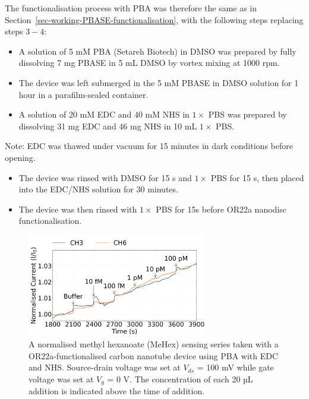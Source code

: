 \documentclass[
  a4paper,
]{scrbook}
\begin{document}
The functionalisation process with PBA was therefore the same as in
Section~\ref{sec-working-PBASE-functionalisation}, with the following
steps replacing steps \(3-4\):

\begin{itemize}
\item
  A solution of 5 mM PBA (Setareh Biotech) in DMSO was prepared by fully
  dissolving 7 mg PBASE in 5 mL DMSO by vortex mixing at 1000 rpm.
\item
  The device was left submerged in the 5 mM PBASE in DMSO solution for 1
  hour in a parafilm-sealed container.
\item
  A solution of 20 mM EDC and 40 mM NHS in \(1 \times\) PBS was prepared
  by dissolving 31 mg EDC and 46 mg NHS in 10 mL \(1 \times\) PBS.
\end{itemize}

Note: EDC was thawed under vacuum for 15 minutes in dark conditions
before opening.

\begin{itemize}
\item
  The device was rinsed with DMSO for 15 s and \(1 \times\) PBS for 15
  s, then placed into the EDC/NHS solution for 30 minutes.
\item
  The device was then rinsed with \(1 \times\) PBS for 15s before OR22a
  nanodisc functionalisation.
\end{itemize}

\begin{figure}

{\centering \includegraphics[width=0.7\textwidth,height=\textheight]{figures/ch7/NTQ25D3_OR22a_sample_220218_EDCNHS.png}

}

\caption{\label{fig-EDCNHS-sensing}A normalised methyl hexanoate (MeHex)
sensing series taken with a OR22a-functionalised carbon nanotube device
using PBA with EDC and NHS. Source-drain voltage was set at \(V_{ds}\) =
100 mV while gate voltage was set at \(V_g\) = 0 V. The concentration of
each 20 µL addition is indicated above the time of addition.}

\end{figure}
\end{document}
